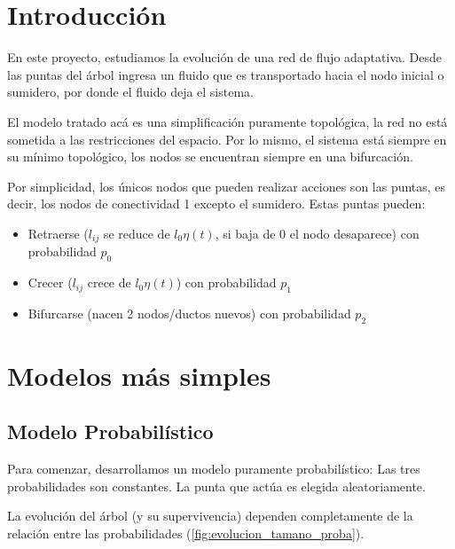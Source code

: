\documentclass{article}
\begin{document}
\section{Introducción}

En este proyecto, estudiamos la evolución de una red de flujo adaptativa. Desde las puntas del árbol ingresa un fluido 
que es transportado hacia el nodo inicial o sumidero, por donde el fluido deja el sistema.

El modelo tratado acá es una simplificación puramente topológica, la red no está sometida a las restricciones del espacio.
Por lo mismo, el sistema está siempre en su mínimo topológico, los nodos se encuentran siempre en una bifurcación.

Por simplicidad, los únicos nodos que pueden realizar acciones son las puntas, es decir, los nodos de conectividad 1 excepto el sumidero.
Estas puntas pueden:

\begin{itemize}

    \item Retraerse ($l_{ij}$ se reduce de $l_0 \eta (t)$, si baja de 0 el nodo desaparece) con probabilidad $p_0$
    \item Crecer ($l_{ij}$ crece de $l_0\eta (t)$) con probabilidad $p_1$
    \item Bifurcarse (nacen 2 nodos/ductos nuevos) con probabilidad $p_2$

\end{itemize} 

\section{Modelos más simples}

\subsection{Modelo Probabilístico}

Para comenzar, desarrollamos un modelo puramente probabilístico: Las tres probabilidades son constantes. La punta que actúa es elegida
aleatoriamente.

La evolución del árbol (y su supervivencia) dependen completamente de la relación entre las probabilidades (\ref{fig:evolucion_tamano_proba}). 
\end{document}
